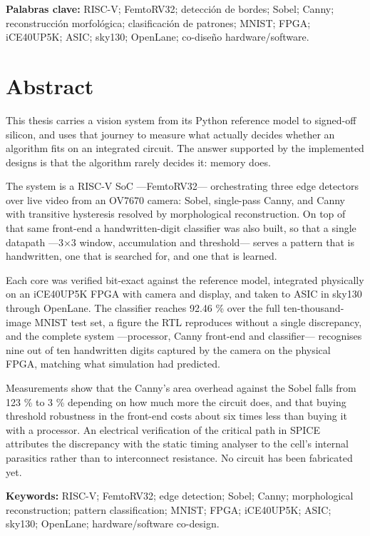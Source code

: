 \textbf{Palabras clave:} RISC-V; FemtoRV32; detección de bordes; Sobel;
Canny; reconstrucción morfológica; clasificación de patrones; MNIST;
FPGA; iCE40UP5K; ASIC; sky130; OpenLane; co-diseño hardware/software.

\newpage

\chapter{Abstract}\label{abstract}

This thesis carries a vision system from its Python reference model to
signed-off silicon, and uses that journey to measure what actually
decides whether an algorithm fits on an integrated circuit. The answer
supported by the implemented designs is that the algorithm rarely
decides it: memory does.

The system is a RISC-V SoC ---FemtoRV32--- orchestrating three edge
detectors over live video from an OV7670 camera: Sobel, single-pass
Canny, and Canny with transitive hysteresis resolved by morphological
reconstruction. On top of that same front-end a handwritten-digit
classifier was also built, so that a single datapath ---3×3 window,
accumulation and threshold--- serves a pattern that is handwritten, one
that is searched for, and one that is learned.

Each core was verified bit-exact against the reference model, integrated
physically on an iCE40UP5K FPGA with camera and display, and taken to
ASIC in sky130 through OpenLane. The classifier reaches 92.46 \% over
the full ten-thousand-image MNIST test set, a figure the RTL reproduces
without a single discrepancy, and the complete system ---processor,
Canny front-end and classifier--- recognises nine out of ten handwritten
digits captured by the camera on the physical FPGA, matching what
simulation had predicted.

Measurements show that the Canny's area overhead against the Sobel falls
from 123 \% to 3 \% depending on how much more the circuit does, and
that buying threshold robustness in the front-end costs about six times
less than buying it with a processor. An electrical verification of the
critical path in SPICE attributes the discrepancy with the static timing
analyser to the cell's internal parasitics rather than to interconnect
resistance. No circuit has been fabricated yet.

\textbf{Keywords:} RISC-V; FemtoRV32; edge detection; Sobel; Canny;
morphological reconstruction; pattern classification; MNIST; FPGA;
iCE40UP5K; ASIC; sky130; OpenLane; hardware/software co-design.

